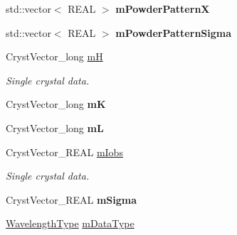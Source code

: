 \begin{DoxyCompactItemize}
\mbox{\label{class_obj_cryst_1_1_c_i_f_data_abc2e62051c30884128ed1d07f16bfe23}} 
std\+::vector$<$ R\+E\+AL $>$ {\bfseries m\+Powder\+PatternX}
\item 
\mbox{\label{class_obj_cryst_1_1_c_i_f_data_acc81b26ee5930be8db131148065f9fd6}} 
std\+::vector$<$ R\+E\+AL $>$ {\bfseries m\+Powder\+Pattern\+Sigma}
\item 
\mbox{\label{class_obj_cryst_1_1_c_i_f_data_a49fa1a8ae167c7c96822fbae5d8af9e8}} 
Cryst\+Vector\+\_\+long \mbox{\hyperlink{class_obj_cryst_1_1_c_i_f_data_a49fa1a8ae167c7c96822fbae5d8af9e8}{mH}}
\begin{DoxyCompactList}\small\item\em Single crystal data. \end{DoxyCompactList}\item 
\mbox{\label{class_obj_cryst_1_1_c_i_f_data_acd4fd8612a1b0c7a53d0b1b09ef56b71}} 
Cryst\+Vector\+\_\+long {\bfseries mK}
\item 
\mbox{\label{class_obj_cryst_1_1_c_i_f_data_ad4adc3dc03d37e9a7ee0a224edb69929}} 
Cryst\+Vector\+\_\+long {\bfseries mL}
\item 
\mbox{\label{class_obj_cryst_1_1_c_i_f_data_a1834128eaf7946e021a05461e3f37a7f}} 
Cryst\+Vector\+\_\+\+R\+E\+AL \mbox{\hyperlink{class_obj_cryst_1_1_c_i_f_data_a1834128eaf7946e021a05461e3f37a7f}{m\+Iobs}}
\begin{DoxyCompactList}\small\item\em Single crystal data. \end{DoxyCompactList}\item 
\mbox{\label{class_obj_cryst_1_1_c_i_f_data_a4fd94532ba94bec1910dd1c3335c2fa6}} 
Cryst\+Vector\+\_\+\+R\+E\+AL {\bfseries m\+Sigma}
\item 
\mbox{\label{class_obj_cryst_1_1_c_i_f_data_a0f9d41853a8805a2ef1730271d71f65f}} 
\mbox{\hyperlink{namespace_obj_cryst_a551a5807d5afe2d986758d9a6953a880}{Wavelength\+Type}} \mbox{\hyperlink{class_obj_cryst_1_1_c_i_f_data_a0f9d41853a8805a2ef1730271d71f65f}{m\+Data\+Type}}

\end{DoxyCompactItemize}
